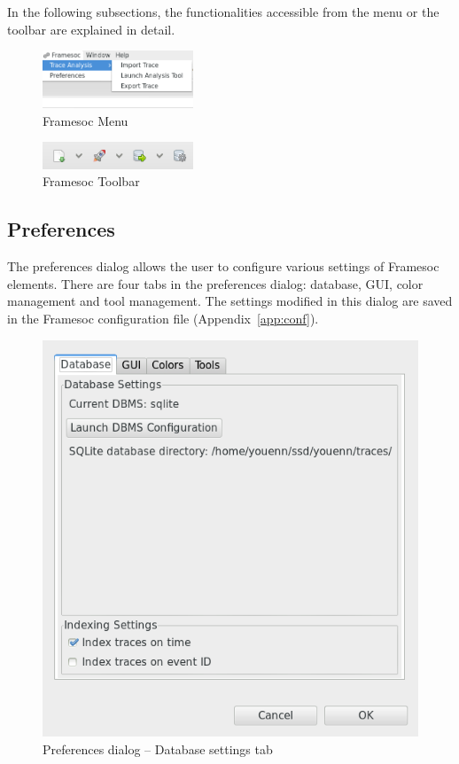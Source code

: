 \documentclass[twoside]{article}
\begin{document}
\begin{sloppypar}
In the following subsections, the functionalities accessible from the menu or the toolbar are explained in detail.

\begin{figure}[h!]
  \centering

    \includegraphics[width=0.4\textwidth]{images/menu.png}
  \caption{Framesoc Menu}
  \label{fig:menu}
\end{figure}

\begin{figure}[h!]
  \centering
    \includegraphics[width=0.4\textwidth]{images/toolbar.png}
  \caption{Framesoc Toolbar}
  \label{fig:toolbar}
\end{figure}

\subsection{Preferences}
\label{subsec:pref}
The preferences dialog allows the user to configure various settings of Framesoc elements. There are four tabs in the preferences dialog: database, GUI, color management and tool management. The settings modified in this dialog are saved in the Framesoc configuration file (Appendix~\ref{app:conf}). 

\begin{figure}[h!]
	\centering
	\includegraphics[width=.5\textwidth]{images/pref_db.png}
	\caption{Preferences dialog -- Database settings tab}
	\label{fig:pref_dialog_db}
\end{figure} 


\end{sloppypar}
\end{document}
